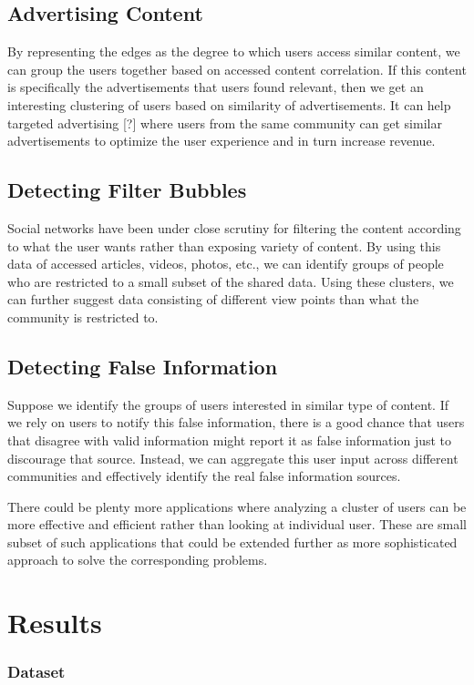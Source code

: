 \documentclass{article}
\begin{document}
\subsection{Advertising Content}
By representing the edges as the degree to which users access similar content, we can group the users together based on
accessed content correlation. If this content is specifically the advertisements that users found relevant, then we get
an interesting clustering of users based on similarity of advertisements. It can help targeted advertising [?] where
users from the same community can get similar advertisements to optimize the user experience and in turn increase
revenue.

\subsection{Detecting Filter Bubbles}
Social networks have been under close scrutiny for filtering the content according to what the user wants rather than
exposing variety of content. By using this data of accessed articles, videos, photos, etc., we can identify groups of
people who are restricted to a small subset of the shared data. Using these clusters, we can further suggest data
consisting of different view points than what the community is restricted to.

\subsection{Detecting False Information}
Suppose we identify the groups of users interested in similar type of content. If we rely on users to notify this false
information, there is a good chance that users that disagree with valid information might report it as false information
just to discourage that source. Instead, we can aggregate this user input across different communities and effectively
identify the real false information sources. 

There could be plenty more applications where analyzing a cluster of users can be more effective and efficient rather
than looking at individual user. These are small subset of such applications that could be extended further as more
sophisticated approach to solve the corresponding problems.  
\section{Results}
\subsubsection{Dataset}
\label{headings}
\end{document}
